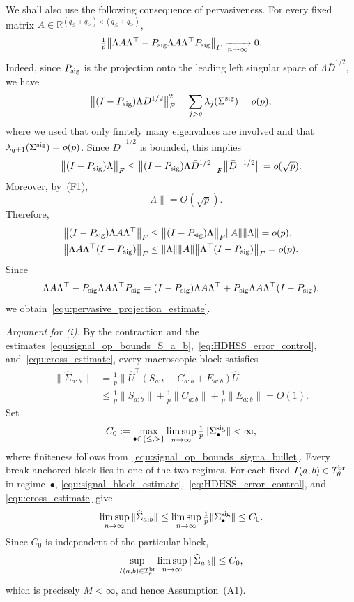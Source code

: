 \documentclass[10pt, letterpaper]{amsart}
\begin{document}
We shall also use the following consequence of pervasiveness. For every fixed matrix
$A\in\mathbb R^{(q_\le+q_>)\times(q_\le+q_>)}$,
\begin{align}\label{equ:pervasive_projection_estimate}
\tfrac1p
\bigl\|
\Lambda A\Lambda^{\top}
-
P_{\rm sig}\Lambda A\Lambda^{\top}P_{\rm sig}
\bigr\|_F
\xrightarrow[n\to\infty]{}0 .
\end{align}
Indeed, since $P_{\rm sig}$ is the projection onto the leading left singular space of
$\Lambda\bar D^{1/2}$, we have
\begin{align}
\bigl\|(I-P_{\rm sig})\Lambda\bar D^{1/2}\bigr\|_F^2
=
\sum_{j>q}\lambda_j(\Sigma^{\rm sig})
=
o(p),
\end{align}
where we used that only finitely many eigenvalues are involved and that
$\lambda_{q+1}(\Sigma^{\rm sig})=o(p)$. Since $\bar D^{-1/2}$ is bounded, this implies
\begin{align}\label{equ:Lambda_tail_small}
\bigl\|(I-P_{\rm sig})\Lambda\bigr\|_F
\le
\bigl\|(I-P_{\rm sig})\Lambda\bar D^{1/2}\bigr\|_F
\bigl\|\bar D^{-1/2}\bigr\|
=
o(\sqrt p).
\end{align}
Moreover, by~(F1),
\[
\|\Lambda\|=O(\sqrt p).
\]
Therefore,
\begin{align}
\bigl\|(I-P_{\rm sig})\Lambda A\Lambda^{\top}\bigr\|_F
&\le
\bigl\|(I-P_{\rm sig})\Lambda\bigr\|_F
\|A\|
\|\Lambda\|
=o(p),\\
\bigl\|\Lambda A\Lambda^{\top}(I-P_{\rm sig})\bigr\|_F
&\le
\|\Lambda\|
\|A\|
\bigl\|\Lambda^{\top}(I-P_{\rm sig})\bigr\|_F
=o(p).
\end{align}
Since
\[
\Lambda A\Lambda^{\top}
-
P_{\rm sig}\Lambda A\Lambda^{\top}P_{\rm sig}
=
(I-P_{\rm sig})\Lambda A\Lambda^{\top}
+
P_{\rm sig}\Lambda A\Lambda^{\top}(I-P_{\rm sig}),
\]
we obtain~\eqref{equ:pervasive_projection_estimate}.

\medskip

\noindent\emph{Argument for (i).}
By the contraction and the estimates~\eqref{equ:signal_op_bounds_S_a_b},~\eqref{eq:HDHSS_error_control}, and~\eqref{equ:cross_estimate}, every macroscopic block satisfies
\begin{align}
\|\widehat\Sigma_{a:b}\|
&=
\tfrac1p
\bigl\|\widehat U^{\top}(S_{a:b}+C_{a:b}+E_{a:b})\widehat U\bigr\|\\
& \le
\tfrac1p\|S_{a:b}\|
+\tfrac1p\|C_{a:b}\|
+\tfrac1p\|E_{a:b}\|
=O(1).
\end{align}
Set
\[
C_0:=\max_{\bullet\in\{\leq,>\}}
\limsup_{n\to\infty}\tfrac1p\|\Sigma_\bullet^{\rm sig}\|<\infty,
\]
where finiteness follows from~\eqref{equ:signal_op_bounds_sigma_bullet}.
Every break-anchored block lies in one of the two regimes. For each fixed
$I(a,b)\in\mathcal I_\theta^{\rm br}$ in regime~$\bullet$,
\eqref{equ:signal_block_estimate},~\eqref{eq:HDHSS_error_control}, and
\eqref{equ:cross_estimate} give
\[
\limsup_{n\to\infty}\|\widehat\Sigma_{a:b}\|
\leq
\limsup_{n\to\infty}\tfrac1p\|\Sigma_\bullet^{\rm sig}\|
\leq C_0.
\]
Since $C_0$ is independent of the particular block,
\[
\sup_{I(a,b)\in\mathcal I_\theta^{\rm br}}
\limsup_{n\to\infty}\|\widehat\Sigma_{a:b}\|
\leq C_0,
\]
which is precisely $M<\infty$, and hence Assumption~(A1).
\end{document}
